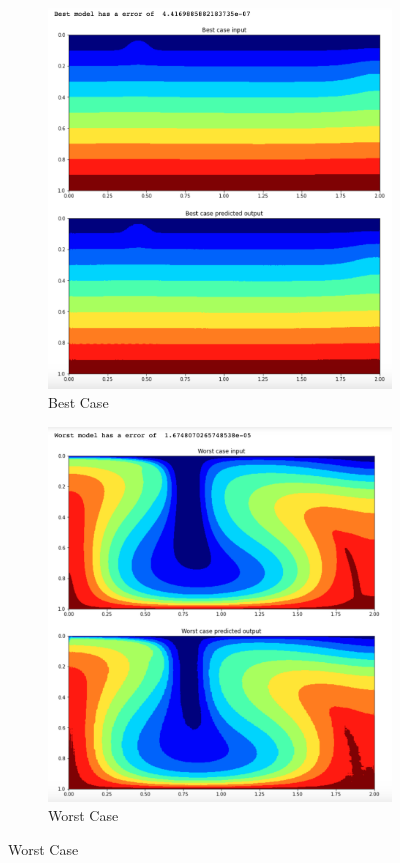 \begin{figure}[H]
\centering
\begin{subfigure}{0.45\textwidth}
    \includegraphics[width=\textwidth]{figures/mantle_convection_images/limited_dataset/ConvAE_Best.png}
    \caption{Best Case}
    \label{fig:first}
\end{subfigure}
\hfill
\begin{subfigure}{0.45\textwidth}
    \includegraphics[width=\textwidth]{figures/mantle_convection_images/limited_dataset/ConvAE_Worst.png}
    \caption{Worst Case}
    \label{fig:second}
\end{subfigure}
        

\end{figure}
